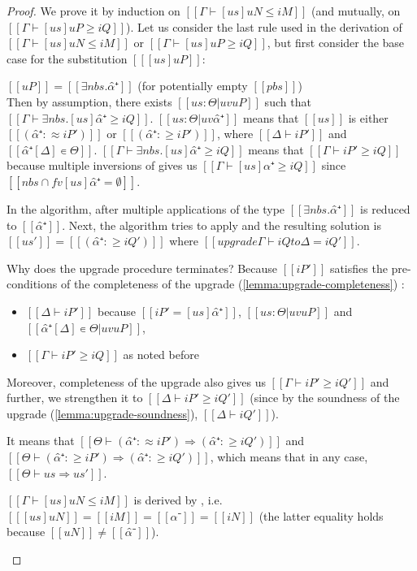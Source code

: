 \begin{proof}
    We prove it by induction on $[[ Γ ⊢ [us]uN ≤ iM ]]$ (and mutually, on $[[ Γ ⊢ [us]uP ≥ iQ ]]$).
    Let us consider the last rule used in the derivation of $[[ Γ ⊢ [us]uN ≤ iM ]]$ or $[[ Γ ⊢ [us]uP ≥ iQ ]]$,
    but first consider the base case for the substitution $[[ [us]uP ]]$:
    \begin{caseof}
        \item \label{case:subt-complete-base} $[[uP]] = [[ ∃nbs.α̂⁺ ]]$ (for potentially empty $[[pbs]]$)\\
        Then by assumption, there exists $[[us : Θ | uv uP]]$ such that $[[ Γ ⊢ ∃nbs.[us]α̂⁺ ≥ iQ ]]$.
        $[[us : Θ | uv α̂⁺]]$ means that  $[[us]]$ is either $[[ (α̂⁺ :≈ iP') ]]$ or $[[ (α̂⁺ :≥ iP') ]]$,
        where $[[Δ ⊢ iP']]$ and $[[α̂⁺[Δ] ∊ Θ]]$.
        $[[ Γ ⊢ ∃nbs.[us]α̂⁺ ≥ iQ ]]$ means that $[[Γ ⊢ iP' ≥ iQ]]$
        because multiple inversions of  
        gives us $[[Γ ⊢ [us]α̂⁺ ≥ iQ]]$ since $[[ {nbs} ∩ fv [us]α̂⁺ = ∅]]$.


        In the algorithm, after multiple applications of 
        the type $[[∃nbs.α̂⁺]]$ is reduced to $[[α̂⁺]]$.
        Next, the algorithm tries to apply
        and the resulting solution is $[[us']] = [[(α̂⁺ :≥ iQ')]]$ where
        $[[upgrade Γ ⊢ iQ to Δ = iQ']]$.

        Why does the upgrade procedure terminates?
        Because $[[iP']]$ satisfies the pre-conditions of the completeness of the upgrade
        (\cref{lemma:upgrade-completeness})
        :
        \begin{itemize}
            \item $[[Δ ⊢ iP']]$ because $[[iP' = [us]α̂⁺]]$, $[[us : Θ | uv uP]]$ and 
            $[[α̂⁺[Δ] ∊ Θ | uv uP]]$,
            \item $[[Γ ⊢ iP' ≥ iQ]]$ as noted before
        \end{itemize}
        Moreover, completeness of the upgrade also gives us $[[Γ ⊢ iP' ≥ iQ']]$
        and further, we strengthen it to $[[Δ ⊢ iP' ≥ iQ']]$
        (since by the soundness of the upgrade (\cref{lemma:upgrade-soundness}),
        $[[Δ ⊢ iQ']]$).

        It means that $[[Θ ⊢ (α̂⁺ :≈ iP') ⇒ (α̂⁺ :≥ iQ') ]]$ and 
        $[[ Θ ⊢ (α̂⁺ :≥ iP') ⇒ (α̂⁺ :≥ iQ') ]]$, which means that in any case, 
        $[[ Θ ⊢ us ⇒ us']]$.

        \item \label{case:subt-complete-nvar}
        $[[ Γ ⊢ [us]uN ≤ iM ]]$ is derived by , 
        i.e. $[[ [us]uN ]] = [[iM]] = [[ α⁻ ]] = [[iN]]$ 
        (the latter equality holds because $[[uN]] \neq [[α̂⁻]]$).


\end{caseof}
\end{proof}
